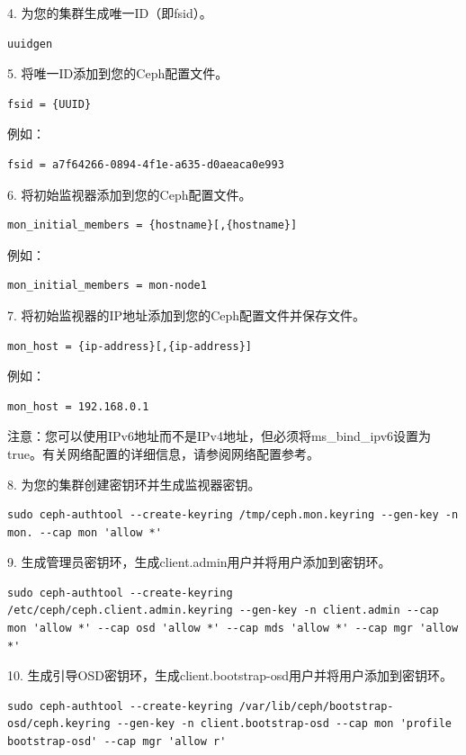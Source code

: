 \documentclass[12pt,UTF8]{ctexbook}
\begin{document}
4. 为您的集群生成唯一ID（即fsid）。
\begin{verbatim}
uuidgen
\end{verbatim}

5. 将唯一ID添加到您的Ceph配置文件。
\begin{verbatim}
fsid = {UUID}
\end{verbatim}

例如：
\begin{verbatim}
fsid = a7f64266-0894-4f1e-a635-d0aeaca0e993
\end{verbatim}

6. 将初始监视器添加到您的Ceph配置文件。
\begin{verbatim}
mon_initial_members = {hostname}[,{hostname}]
\end{verbatim}

例如：
\begin{verbatim}
mon_initial_members = mon-node1
\end{verbatim}

7. 将初始监视器的IP地址添加到您的Ceph配置文件并保存文件。
\begin{verbatim}
mon_host = {ip-address}[,{ip-address}]
\end{verbatim}

例如：
\begin{verbatim}
mon_host = 192.168.0.1
\end{verbatim}

注意：您可以使用IPv6地址而不是IPv4地址，但必须将ms_bind_ipv6设置为true。有关网络配置的详细信息，请参阅网络配置参考。

8. 为您的集群创建密钥环并生成监视器密钥。
\begin{verbatim}
sudo ceph-authtool --create-keyring /tmp/ceph.mon.keyring --gen-key -n mon. --cap mon 'allow *'
\end{verbatim}

9. 生成管理员密钥环，生成client.admin用户并将用户添加到密钥环。
\begin{verbatim}
sudo ceph-authtool --create-keyring /etc/ceph/ceph.client.admin.keyring --gen-key -n client.admin --cap mon 'allow *' --cap osd 'allow *' --cap mds 'allow *' --cap mgr 'allow *'
\end{verbatim}

10. 生成引导OSD密钥环，生成client.bootstrap-osd用户并将用户添加到密钥环。
\begin{verbatim}
sudo ceph-authtool --create-keyring /var/lib/ceph/bootstrap-osd/ceph.keyring --gen-key -n client.bootstrap-osd --cap mon 'profile bootstrap-osd' --cap mgr 'allow r'
\end{verbatim}
\end{document}
